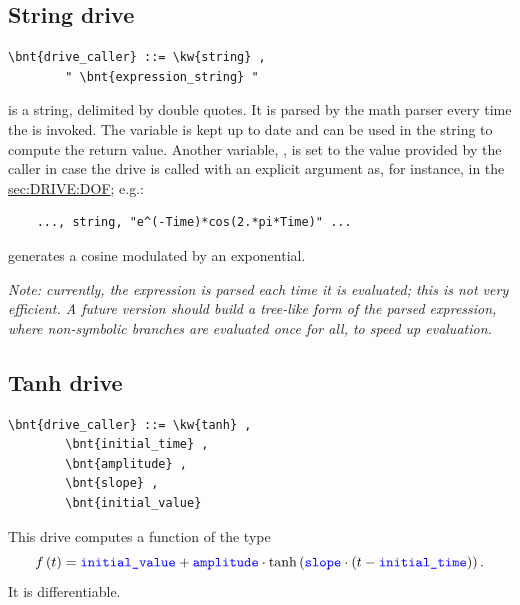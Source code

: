 \subsection{String drive}
\begin{Verbatim}[commandchars=\\\{\}]
    \bnt{drive_caller} ::= \kw{string} ,
        " \bnt{expression_string} "
\end{Verbatim}
 is a string, delimited by double quotes.
It is parsed by the math parser every time 
the  is invoked.
The variable  is kept up to date and can be used in the 
string to compute the return value.
Another variable, , is set to the value provided by the caller
in case the drive is called with an explicit argument as, for instance,
in the \hyperref{\kw{dof drive}}{\kw{dof drive} (see Section~}{)}{sec:DRIVE:DOF};
e.g.:
\begin{verbatim}
    ..., string, "e^(-Time)*cos(2.*pi*Time)" ...
\end{verbatim}
generates a cosine modulated by an exponential.

\emph{Note: currently, the expression is parsed each time it is evaluated;
this is not very efficient.
A future version should build a tree-like form of the
parsed expression, where non-symbolic branches are evaluated once for all,
to speed up evaluation.}

\subsection{Tanh drive}
\begin{Verbatim}[commandchars=\\\{\}]
    \bnt{drive_caller} ::= \kw{tanh} ,
        \bnt{initial_time} ,
        \bnt{amplitude} ,
        \bnt{slope} ,
        \bnt{initial_value}
\end{Verbatim}
This drive computes a function of the type
\begin{displaymath}
	f\left( t \right) = \textcolor{blue}{\texttt{initial\_value}} + \textcolor{blue}{\texttt{amplitude}} \cdot\mathrm{tanh}\left( 
			\textcolor{blue}{\texttt{slope}} \cdot \left( 
				t - \textcolor{blue}{\texttt{initial\_time}}
			 \right)
		 \right) .
\end{displaymath}
It is differentiable.


